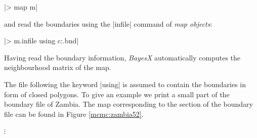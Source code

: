 |> map m|

and read the boundaries using the |infile| command of {\it map objects}:

|> m.infile using c:\data\zambia.bnd|

Having read the boundary information, {\it BayesX} automatically computes the neighbourhood matrix of the map.

The file following the keyword |using| is assumed to contain the boundaries in form of closed polygons. To give an example we
print a small part of the boundary file of Zambia. The map corresponding to the section of the boundary file can be found in
Figure \ref{mcmc:zambia52}.

\footnotesize

\hspace{1cm}  $\vdots$

